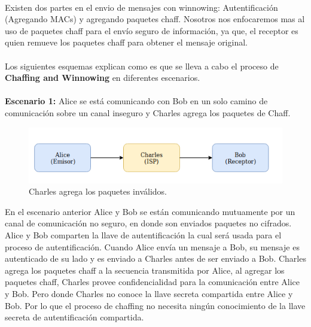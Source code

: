 \documentclass[12pt, a4paper, titlepage]{report}
\begin{document}
        \paragraph{}
        Existen dos partes en el envio de mensajes con winnowing: Autentificaci\'on (Agregando MACs) y agregando paquetes chaff. Nosotros nos enfocaremos mas al uso de paquetes chaff para el env\'io seguro de informaci\'on, ya que, el receptor es quien remueve los paquetes chaff para obtener el mensaje original. 
        
        \paragraph{}
        Los siguientes esquemas explican como es que se lleva a cabo el proceso de \textbf{Chaffing and Winnowing} en diferentes escenarios.
        
		\paragraph{}
		\textbf{Escenario 1:} Alice se est\'a comunicando con Bob en un solo camino de comunicación sobre un canal inseguro y Charles agrega los paquetes de Chaff.\\
		\begin{figure}[!htb]
			\begin{center}	                  \includegraphics[width=14cm]{./imagenes/MarcoTeorico/chaffProcess.png}
				\caption{Charles agrega los paquetes inválidos.}
			\end{center}
		\end{figure}
		
		En el escenario anterior Alice y Bob se están comunicando mutuamente por un canal de comunicación no seguro, en donde son enviados paquetes no cifrados. Alice y Bob comparten la llave de autentificación la cual será usada para el proceso de autentificación. Cuando Alice envía un mensaje a Bob, su mensaje es autenticado de su lado y es enviado a Charles antes de ser enviado a Bob. Charles agrega los paquetes chaff a la secuencia transmitida por Alice, al agregar los paquetes chaff, Charles provee confidencialidad para la comunicación entre Alice y Bob. Pero donde Charles no conoce la llave secreta compartida entre Alice y Bob. Por lo que el proceso de chaffing no necesita ningún conocimiento de la llave secreta de autentificación compartida.
\end{document}
